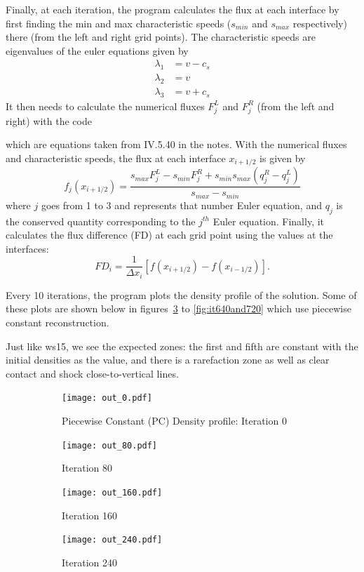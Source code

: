 \documentclass[11pt,letterpaper]{article}
\begin{document}
Finally, at each iteration, the program calculates the flux at each interface by first
finding the min and max characteristic speeds ($s_{min}$ and $s_{max}$ respectively) 
there (from the left and right grid points). The characteristic speeds are eigenvalues 
of the euler equations given by 
\begin{align*}
\lambda_1 &= v - c_s \\
\lambda_2 &= v \\
\lambda_3 &= v + c_s
\end{align*}
It then needs to calculate the numerical fluxes $F^L_j$ and $F^R_j$ (from the left 
and right) with the code

which are equations taken from IV.5.40 in the notes. With the numerical fluxes and
characteristic speeds, the flux at each interface $x_{i+1/2}$ is given by 
$$ f_j(x_{i+1/2}) =  \frac{s_{max}F^L_j - s_{min}F^R_j + s_{min}s_{max}(q^R_j - q^L_j)}{s_{max} - s_{min}} $$
where $j$ goes from 1 to 3 and represents that number Euler equation, and $q_j$ is the conserved quantity corresponding to the $j^{th}$ Euler equation. Finally, it calculates
the flux difference (FD) at each grid point using the values at the interfaces:
$$ FD_i = \frac{1}{\Delta x_i} [f(x_{i+1/2}) - f(x_{i-1/2})]. $$

Every 10 iterations, the program plots the density profile of the solution. Some 
of these plots are shown below in figures~\ref{fig:it0and80} to \ref{fig:it640and720} which
use piecewise constant reconstruction. 

Just like ws15, we see the expected zones: the first and fifth are constant with the initial
densities as the value, and there is a rarefaction zone as well as clear contact and shock 
close-to-vertical lines.

\begin{figure}[bth]
\centering
\begin{subfigure}{.5\textwidth}
  \centering
  \texttt{[image: out\_0.pdf]}
  \caption*{Piecewise Constant (PC) Density profile: Iteration 0}
  \label{fig:sub1}
\end{subfigure}%
\begin{subfigure}{.5\textwidth}
  \centering
  \texttt{[image: out\_80.pdf]}
  \caption*{Iteration 80}
  \label{fig:sub2}
\end{subfigure}
\caption{}
\label{fig:it0and80}
\end{figure}

\begin{figure}[bth]
\centering
\begin{subfigure}{.5\textwidth}
  \centering
  \texttt{[image: out\_160.pdf]}
  \caption*{Iteration 160}
  \label{fig:sub3}
\end{subfigure}%
\begin{subfigure}{.5\textwidth}
  \centering
  \texttt{[image: out\_240.pdf]}
  \caption*{Iteration 240}
  \label{fig:sub4}
\end{subfigure}
\caption{}
\label{fig:it160and240}
\end{figure}
\end{document}
